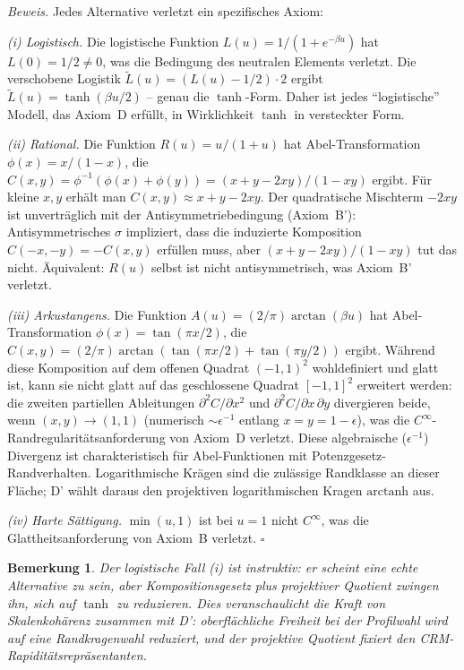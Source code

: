 \documentclass[aps,prd,twocolumn,superscriptaddress,nofootinbib]{revtex4-2}
\newtheorem{remark}{Bemerkung}
\begin{document}
\textit{Beweis.} Jedes Alternative verletzt ein spezifisches Axiom:

\textit{(i) Logistisch.} Die logistische Funktion $L(u) = 1/(1 + e^{-\beta u})$ hat $L(0) = 1/2 \neq 0$, was die Bedingung des neutralen Elements verletzt. Die verschobene Logistik $\tilde{L}(u) = (L(u) - 1/2) \cdot 2$ ergibt $\tilde{L}(u) = \tanh(\beta u/2)$ -- genau die $\tanh$-Form. Daher ist jedes ``logistische'' Modell, das Axiom~D erfüllt, in Wirklichkeit $\tanh$ in versteckter Form.

\textit{(ii) Rational.} Die Funktion $R(u) = u/(1+u)$ hat Abel-Transformation $\phi(x) = x/(1-x)$, die $C(x,y) = \phi^{-1}(\phi(x) + \phi(y)) = (x + y - 2xy)/(1 - xy)$ ergibt. Für kleine $x, y$ erhält man $C(x,y) \approx x + y - 2xy$. Der quadratische Mischterm $-2xy$ ist unverträglich mit der Antisymmetriebedingung (Axiom~B'): Antisymmetrisches $\sigma$ impliziert, dass die induzierte Komposition $C(-x,-y) = -C(x,y)$ erfüllen muss, aber $(x+y-2xy)/(1-xy)$ tut das nicht. Äquivalent: $R(u)$ selbst ist nicht antisymmetrisch, was Axiom~B' verletzt.

\textit{(iii) Arkustangens.} Die Funktion $A(u) = (2/\pi)\arctan(\beta u)$ hat Abel-Transformation $\phi(x) = \tan(\pi x/2)$, die $C(x,y) = (2/\pi)\arctan(\tan(\pi x/2) + \tan(\pi y/2))$ ergibt. Während diese Komposition auf dem offenen Quadrat $(-1,1)^2$ wohldefiniert und glatt ist, kann sie nicht glatt auf das geschlossene Quadrat $[-1,1]^2$ erweitert werden: die zweiten partiellen Ableitungen $\partial^2 C/\partial x^2$ und $\partial^2 C/\partial x\,\partial y$ divergieren beide, wenn $(x,y) \to (1,1)$ (numerisch $\sim \epsilon^{-1}$ entlang $x = y = 1 - \epsilon$), was die $C^\infty$-Randregularitätsanforderung von Axiom~D verletzt. Diese algebraische ($\epsilon^{-1}$) Divergenz ist charakteristisch für Abel-Funktionen mit Potenzgesetz-Randverhalten. Logarithmische Krägen sind die zulässige Randklasse an dieser Fläche; D' wählt daraus den projektiven logarithmischen Kragen $\mathrm{arctanh}$ aus.

\textit{(iv) Harte Sättigung.} $\min(u, 1)$ ist bei $u = 1$ nicht $C^\infty$, was die Glattheitsanforderung von Axiom~B verletzt. \hfill $\square$

\begin{remark}
Der logistische Fall (i) ist instruktiv: er scheint eine echte Alternative zu sein, aber Kompositionsgesetz plus projektiver Quotient zwingen ihn, sich auf $\tanh$ zu reduzieren. Dies veranschaulicht die Kraft von Skalenkohärenz zusammen mit D': oberflächliche Freiheit bei der Profilwahl wird auf eine Randkragenwahl reduziert, und der projektive Quotient fixiert den CRM-Rapiditätsrepräsentanten.
\end{remark}
\end{document}
